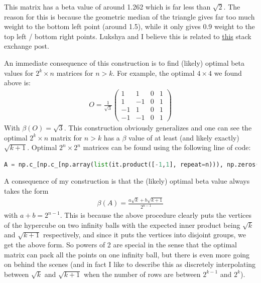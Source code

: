 \documentclass[12pt]{article}
\theoremstyle{definitionstyle}
\begin{document}
    This matrix has a beta value of around 1.262 which is far less than $\sqrt{2}$. The reason for this is because the geometric median of the triangle gives far too much weight to the bottom left point (around 1.5), while it only gives 0.9 weight to the top left / bottom right points. Lukshya and I believe this is related to \href{https://math.stackexchange.com/questions/3966303/evenly-distributing-n2-ball-between-n-pockets-by-chosing-2-of-them-at-a-t}{this} stack exchange post.

    An immediate consequence of this construction is to find (likely) optimal beta values for $2^k \times n$ matrices for $n > k$. For example, the optimal $4 \times 4$ we found above is:
    \begin{align*}
        O = \frac{1}{\sqrt{3}}\begin{pmatrix}
            1 & 1 & 0 & 1 \\
            1 & -1 & 0 & 1 \\
            -1 & 1 & 0 & 1 \\
            -1 & -1 & 0 & 1
        \end{pmatrix}
    \end{align*}
    With $\beta(O) = \sqrt{3}$. This construction obviously generalizes and one can see the optimal $2^k \times n$ matrix for $n > k$ has a $\beta$ value of at least (and likely exactly) $\sqrt{k+1}$. Optimal $2^n \times 2^n$ matrices can be found using the following line of code:
    \begin{lstlisting}[language=Python]
        A = np.c_[np.c_[np.array(list(it.product([-1,1], repeat=n))), np.zeros((2**n, 2**n-n-1))], np.ones((2**n, 1))]
    \end{lstlisting}
    

    A consequence of my construction is that the (likely) optimal beta value always takes the form
    \begin{align*}
        \beta(A) = \frac{a\sqrt{k} + b\sqrt{k+1}}{2^{n-1}}
    \end{align*}
    with $a+b=2^{n-1}$. This is because the above procedure clearly puts the vertices of the hypercube on two infinity balls with the expected inner product being $\sqrt{k}$ and $\sqrt{k+1}$ respectively, and since it puts the vertices into disjoint groups, we get the above form. So powers of 2 are special in the sense that the optimal matrix can pack all the points on one infinity ball, but there is even more going on behind the scenes (and in fact I like to describe this as discretely interpolating between $\sqrt{k}$ and $\sqrt{k+1}$ when the number of rows are between $2^{k-1}$ and $2^k$).
\end{document}
